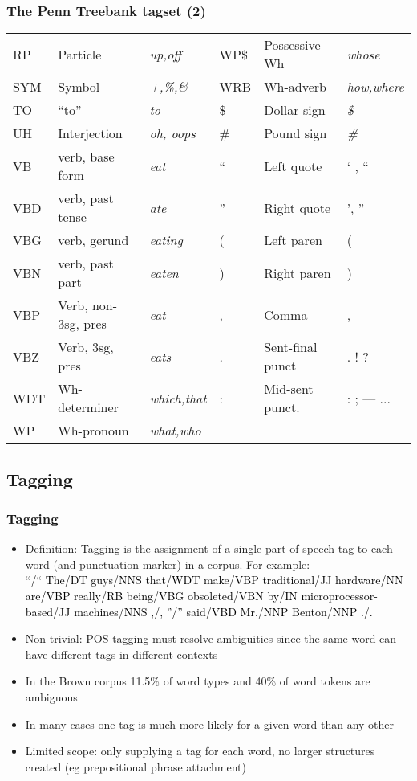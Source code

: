 \documentclass{beamer}
\begin{document}
\begin{frame}
  \frametitle{The Penn Treebank tagset (2)}
  {\footnotesize
    \begin{tabular}{|lll|lll|}
      \hline
      RP & Particle & \emph{up,off} &
      WP\$ & Possessive-Wh & \emph{whose} \\ 
      SYM & Symbol & \emph{+,\%,\&}  &
      WRB & Wh-adverb & \emph{how,where} \\
      TO & ``to'' & \emph{to} &
      \$ & Dollar sign & \emph{\$}\\
      UH & Interjection & \emph{oh, oops} &
      \# & Pound sign & \emph{\#} \\
      VB & verb, base form &     \emph{eat} &
      `` & Left quote & ` , `` \\
      VBD & verb, past tense & \emph{ate} &
      '' & Right quote & ', '' \\
      VBG & verb, gerund & \emph{eating} &
      ( & Left paren & ( \\
      VBN & verb, past part & \emph{eaten} &
      ) & Right paren & ) \\
      VBP & Verb, non-3sg, pres & \emph{eat} &
      , & Comma & , \\
      VBZ & Verb, 3sg, pres & \emph{eats} &
      . & Sent-final punct & . ! ? \\
      WDT & Wh-determiner &  \emph{which,that} &
      : & Mid-sent punct. & : ; --- ... \\
      WP & Wh-pronoun & \emph{what,who} & & & \\
      \hline
    \end{tabular}
  }
\end{frame}

\subsection{Tagging}

\begin{frame}
  \frametitle{Tagging}
  \begin{itemize}
  \item Definition: Tagging is the assignment of a single
    part-of-speech tag to each word (and punctuation marker) in a
    corpus.  For example:\\
    {\scriptsize
    \textcolor{black}{``/``  The/DT  guys/NNS  that/WDT  make/VBP
      traditional/JJ  hardware/NN  are/VBP  really/RB  being/VBG
      obsoleted/VBN  by/IN  microprocessor-based/JJ  machines/NNS  ,/,
      ''/''  said/VBD  Mr./NNP  Benton/NNP  ./.}}
  \item Non-trivial: POS tagging must resolve ambiguities since the
    same word can have different tags in different contexts
  \item In the Brown corpus 11.5\% of word types and 40\% of word
    tokens are ambiguous
  \item In many cases one tag is much more likely for a given word
    than any other
  \item Limited scope: only supplying a tag for each word, no larger
    structures created (eg prepositional phrase attachment)
  \end{itemize}  
\end{frame}
\end{document}
